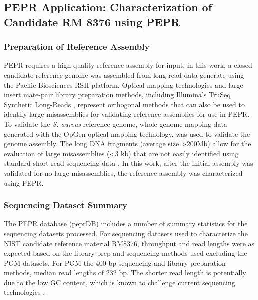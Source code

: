 \documentclass[smallextended]{svjour3}\usepackage[]{graphicx}\usepackage[]{color}
\begin{document}
\subsection{PEPR Application: Characterization of Candidate RM 8376 using PEPR}
\subsubsection{Preparation of Reference Assembly}
PEPR requires a high quality reference assembly for input, in this work, a closed candidate reference genome was assembled from long read data generate using the Pacific Biosciences RSII platform. Optical mapping technologies and large insert mate-pair library preparation methods, including Illumina's TruSeq Synthetic Long-Reads \cite{McCoy2014}, represent orthogonal methods that can also be used to identify large misassemblies for validating reference assemblies for use in PEPR. To validate the \textit{S. aureus} reference genome, whole genome mapping data generated with the OpGen optical mapping technology, was used to validate the genome assembly. The long DNA fragments (average size \textgreater 200Mb) allow for the evaluation of large misassemblies (\textless 3 kb) that are not easily identified using standard short read sequencing data \cite{Mendelowitz2014}. In this work, after the initial assembly was validated for no large misassemblies, the reference assembly was characterized using PEPR. 

\subsubsection{Sequencing Dataset Summary}
The PEPR database (peprDB) includes a number of summary statistics for the sequencing datasets processed.  For sequencing datasets used to characterize the NIST candidate reference material RM8376, throughput and read lengths were as expected based on the library prep and sequencing methods used excluding the PGM datasets. For PGM the 400 bp sequencing and library preparation methods, median read lengths of 232 bp. The shorter read length is potentially due to the low GC content, which is known to challenge current sequencing technologies \cite{Quail2012}.  
\end{document}
